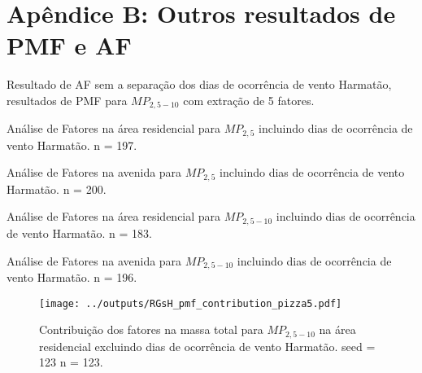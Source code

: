\chapter{Apêndice B: Outros resultados de PMF e AF \label{apendice:pmf_fa}}

Resultado de AF sem a separação dos dias de ocorrência de vento Harmatão, 
resultados de PMF para $MP_{2,5-10}$ com extração de 5 fatores. 

\begin{table}[H]
  \centering
  
  \caption{Análise de Fatores na área residencial para $MP_{2,5}$
          incluindo dias de ocorrência de vento Harmatão. n = 197.
          \label{table:AF_RFcH5}}
\end{table}

\begin{table}[H]
  \centering
  
  \caption{Análise de Fatores na avenida para $MP_{2,5}$
           incluindo dias de ocorrência de vento Harmatão. n = 200.
          \label{table:AF_TFcH5}}
\end{table}

\begin{table}[H]
  \centering
  
  \caption{Análise de Fatores na área residencial para $MP_{2,5-10}$
          incluindo dias de ocorrência de vento Harmatão. n = 183.
          \label{table:AG_RFcH4}}
\end{table}

\begin{table}[H]
  \centering
  
  \caption{Análise de Fatores na avenida para $MP_{2,5-10}$
           incluindo dias de ocorrência de vento Harmatão. n = 196.
          \label{table:AF_TGcH4}}
\end{table}

\begin{landscape}
  \begin{figure}
    \centering
    \begin{minipage}[b]{0.45\linewidth}
      \texttt{[image: ../outputs/RGsH\_pmf\_contribution\_pizza5.pdf]}
      \caption{Contribuição dos fatores na massa total para $MP_{2,5-10}$ na área
               residencial excluindo dias de ocorrência de vento Harmatão. seed = 123 n = 123.
               \label{fig:RGsH_contribution5}}
    \end{minipage}%
    \hspace{0.5cm}
    \begin{minipage}[b]{0.45\linewidth}
      
    \end{minipage}
  \end{figure}
\end{landscape}

